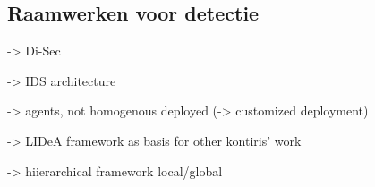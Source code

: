 
\subsection{Raamwerken voor detectie}
\label{subsection:frameworks}

\TODO

\TODO \cite{valero2012di} -> Di-Sec

\TODO \cite{zhang2000intrusion} -> IDS architecture

\TODO \cite{kachirski2003effective} -> agents, not homogenous deployed (-> customized deployment)

\TODO \cite{krontiris2008lidea} -> LIDeA framework as basis for other kontiris' work

\TODO \cite{huang1999large} -> hiierarchical framework local/global

